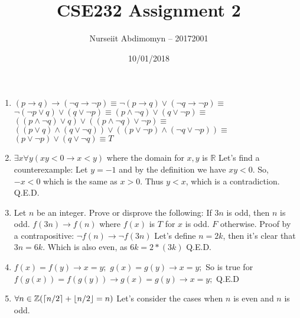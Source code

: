 \documentclass[12pt]{article}
\title{CSE232 Assignment 2}
\author{Nurseiit Abdimomyn -- 20172001}
\date{10/01/2018}
\DeclarePairedDelimiter{\ceil}{\lceil}{\rceil}
\DeclarePairedDelimiter{\floor}{\lfloor}{\rfloor}
\begin{document}
\maketitle

\begin{enumerate}
  \item
    $(p \to q) \to (\neg q \to \neg p) \equiv \neg (p \to q) \lor (\neg q \to \neg p) \equiv$
    \newline
    $\neg (\neg p \lor q) \lor (q \lor \neg p) \equiv (p \land \neg q) \lor (q \lor \neg p) \equiv$
    \newline
    $((p \land \neg q) \lor q) \lor ((p \land \neg q) \lor \neg p) \equiv$
    \newline
    $((p \lor q) \land (q \lor \neg q)) \lor ((p \lor \neg p) \land (\neg q \lor \neg p)) \equiv$
    \newline
    $(p \lor \neg p) \lor (q \lor \neg q) \equiv T$
  \item
    $\exists x \forall y (xy < 0 \to x < y)$ where the domain for $x, y$ is $\mathbb{R}$
    \newline
    Let's find a counterexample:
    \newline
    Let $y = -1$ and by the definition we have $xy < 0$. So, $-x < 0$ which is the same as $x > 0$. Thus $y < x$, which is a contradiction. Q.E.D.
  \item
    Let $n$ be an integer.  Prove or disprove the following:  If $3n$ is odd, then $n$ is odd.
    \newline
    $f(3n) \to f(n)$ where $f(x)$ is $T$ for $x$ is odd. $F$ otherwise.
    \newline \newline
    Proof by a contrapositive:
    \newline
    $\neg f(n) \to \neg f(3n)$
    \newline
    Let's define $n = 2k$, then it's clear that $3n = 6k$. Which is also even, as $6k = 2*(3k)$ Q.E.D.
  \item
    $f(x) = f(y) \to x = y;$ \newline
    $g(x) = g(y) \to x = y;$ \newline
    So is true for $f(g(x)) = f(g(y)) \to g(x) = g(y) \to x = y;$ \newline
    Q.E.D
  \item
    $\forall n \in \mathbb{Z} (\ceil{n/2} + \floor{n/2} = n)$ \newline
    Let's consider the cases when $n$ is even and $n$ is odd. \newline \newline

\end{enumerate}
\end{document}
